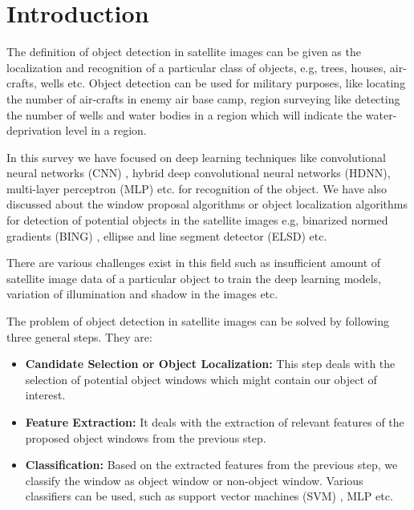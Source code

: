 \chapter{Introduction}
The definition of object detection in satellite images can be given as the localization and recognition of a particular class of objects, e.g, trees, houses, air-crafts, wells etc. Object detection can be used for military purposes, like locating the number of air-crafts in enemy air base camp, region surveying like detecting the number of wells and water bodies in a region which will indicate the water-deprivation level in a region. 
\par In this survey we have focused on deep learning techniques like convolutional neural networks (CNN) \cite{b1}, hybrid deep convolutional neural networks (HDNN), multi-layer perceptron (MLP) etc. for recognition of the object. We have also discussed about the window proposal algorithms or object localization algorithms for detection of potential objects in the satellite images e.g, binarized normed gradients (BING) \cite{b2}, ellipse and line segment detector (ELSD) \cite{b4} etc. 
\par There are various challenges exist in this field such as insufficient amount of satellite image data of a particular object to train the deep learning models, variation of illumination and shadow in the images etc.
\par The problem of object detection in satellite images can be solved by following three general steps. They are: 
\begin{itemize}
    \item \textbf{Candidate Selection or Object Localization: }This step deals with the selection of potential object windows which might contain our object of interest.
    \item \textbf{Feature Extraction: }It deals with the extraction of relevant features of the proposed object windows from the previous step. 
    \item \textbf{Classification: } Based on the extracted features from the previous step, we classify the window as object window or non-object window. Various classifiers can be used, such as support vector machines (SVM) \cite{b3}, MLP etc.
\end{itemize}
